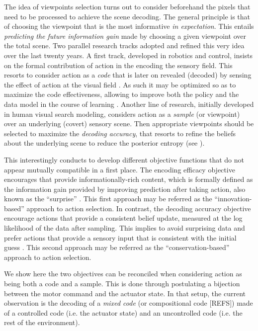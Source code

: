\documentclass{article}
\begin{document}
The idea of viewpoints selection turns out to consider beforehand the pixels that need to be processed to achieve the scene decoding. The general principle is that of
choosing the viewpoint that is the most {\color{blue} informative} \emph{in expectation}. This entails \emph{predicting the future {\color{blue} information gain}} made by choosing a given viewpoint over the total scene. Two parallel research tracks adopted and refined this very idea over the last twenty years. A first track, developed in robotics and control, insists on the formal contribution of action in the encoding the sensory field. This resorts to consider action as a \emph{code} that is later on revealed (decoded) by sensing the effect of action at the visual field \citep{klyubin2005empowerment,tishby2011information}. As such it may be optimized so as to maximize the code effectiveness, allowing to improve both the policy and the data model in the course of learning \citep{schmidhuber2007simple,mohamed2015variational,houthooft2016vime}. Another line of research, initially developed in human visual search modeling, considers action as a \emph{sample} (or viewpoint) over an underlying (covert) sensory scene. Then appropriate viewpoints should be selected to maximize the \emph{decoding accuracy}, that resorts to refine the beliefs about the underlying scene to reduce the posterior entropy (see \cite{najemnik2005optimal,najemnik2009simple,butko2010infomax,friston2012perceptions}).
  
This interestingly conducts to develop different objective functions that do not appear mutually compatible in a first place. The encoding efficacy objective encourages that provide informationally-rich content, which is formally defined as the information gain provided by improving prediction after taking action, also known as the ``surprise'' \cite{itti2005bayesian}. This first approach may be referred as the ``innovation-based'' approach to action selection. In contrast, the decoding accuracy objective encourage actions that provide a consistent belief update, measured at the log likelihood of the data after sampling. This implies to avoid surprising data and prefer actions that provide a sensory input that is consistent with the initial guess \cite{friston2010free}. This second approach may be referred as the ``conservation-based'' approach to action selection.  

We show here the two objectives can be reconciled when considering action as being both a code and a sample. This is done through postulating a bijection between the motor command and the actuator state.
In that setup, the current observation is the decoding of a \emph{mixed code} (or compositional code {\color{blue}[REFS]}) made of a controlled code (i.e. the actuator state) and an uncontrolled code (i.e. the rest of the environment).
\end{document}
